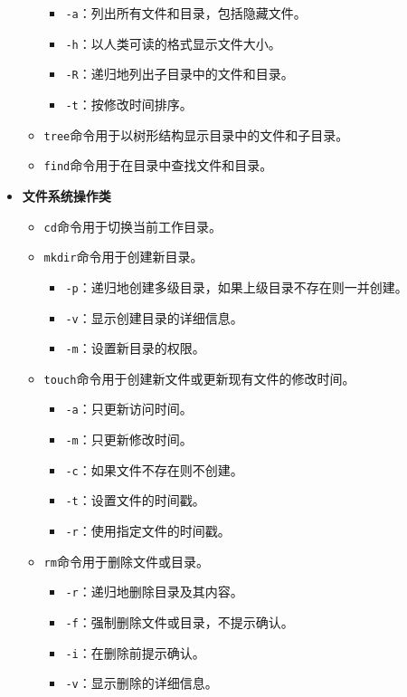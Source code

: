 \documentclass[../main.tex]{subfiles}
\begin{document}
\begin{itemize}
\begin{itemize}
\begin{itemize}
          \item \texttt{-a}：列出所有文件和目录，包括隐藏文件。
          \item \texttt{-h}：以人类可读的格式显示文件大小。
          \item \texttt{-R}：递归地列出子目录中的文件和目录。
          \item \texttt{-t}：按修改时间排序。
        \end{itemize}
      \item \texttt{tree}命令用于以树形结构显示目录中的文件和子目录。
      \item \texttt{find}命令用于在目录中查找文件和目录。
    \end{itemize}
  \item \textbf{文件系统操作类}
    \begin{itemize}
      \item \texttt{cd}命令用于切换当前工作目录。
      \item \texttt{mkdir}命令用于创建新目录。
        \begin{itemize}
          \item \texttt{-p}：递归地创建多级目录，如果上级目录不存在则一并创建。
          \item \texttt{-v}：显示创建目录的详细信息。
          \item \texttt{-m}：设置新目录的权限。
        \end{itemize}
      \item \texttt{touch}命令用于创建新文件或更新现有文件的修改时间。
        \begin{itemize}
          \item \texttt{-a}：只更新访问时间。
          \item \texttt{-m}：只更新修改时间。
          \item \texttt{-c}：如果文件不存在则不创建。
          \item \texttt{-t}：设置文件的时间戳。
          \item \texttt{-r}：使用指定文件的时间戳。
        \end{itemize}
      \item \texttt{rm}命令用于删除文件或目录。
        \begin{itemize}
          \item \texttt{-r}：递归地删除目录及其内容。
          \item \texttt{-f}：强制删除文件或目录，不提示确认。
          \item \texttt{-i}：在删除前提示确认。
          \item \texttt{-v}：显示删除的详细信息。

\end{itemize}
\end{itemize}
\end{itemize}
\end{document}
